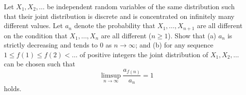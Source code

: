 Let $X_1, X_2, \ldots$ be independent random variables of the same distribution such that their joint distribution is discrete and is concentrated on infinitely many different values. Let $a_n$ denote the probability that $X_1,\ldots, X_{n+1}$ are all different on the condition that $X_1,\ldots, X_n$ are all different ($n\ge 1$). Show that
(a) $a_n$ is strictly decreasing and tends to $0$ as $n\to \infty$; and
(b) for any sequence $1\le f(1)\le f(2) < \ldots$ of positive integers the joint distribution of $X_1, X_2, \ldots$ can be chosen such that
$$\limsup_{n\to\infty}\frac{a_{f(n)}}{a_n}=1$$holds.